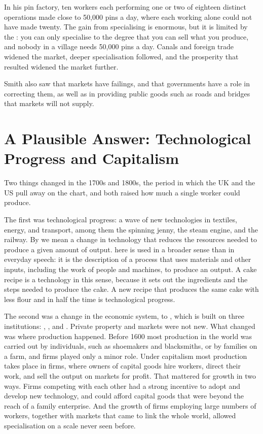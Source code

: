 \documentclass[11pt]{article}
\begin{document}
 In his pin factory, ten workers each performing one or two of eighteen distinct operations made close to 50,000 pins a day, where each working alone could not have made twenty. The gain from specialising is enormous, but it is limited by the : you can only specialise to the degree that you can sell what you produce, and nobody in a village needs 50,000 pins a day. Canals and foreign trade widened the market, deeper specialisation followed, and the prosperity that resulted widened the market further.

Smith also saw that markets have failings, and that governments have a role in correcting them, as well as in providing public goods such as roads and bridges that markets will not supply.

\section{A Plausible Answer: Technological Progress and Capitalism}

Two things changed in the 1700s and 1800s, the period in which the UK and the US pull away on the chart, and both raised how much a single worker could produce.

The first was technological progress: a wave of new technologies in textiles, energy, and transport, among them the spinning jenny, the steam engine, and the railway. By  we mean a change in technology that reduces the resources needed to produce a given amount of output.  here is used in a broader sense than in everyday speech: it is the description of a process that uses materials and other inputs, including the work of people and machines, to produce an output. A cake recipe is a technology in this sense, because it sets out the ingredients and the steps needed to produce the cake. A new recipe that produces the same cake with less flour and in half the time is technological progress.

The second was a change in the economic system, to , which is built on three institutions: , , and . Private property and markets were not new. What changed was where production happened. Before 1600 most production in the world was carried out by individuals, such as shoemakers and blacksmiths, or by families on a farm, and firms played only a minor role. Under capitalism most production takes place in firms, where owners of capital goods hire workers, direct their work, and sell the output on markets for profit. That mattered for growth in two ways. Firms competing with each other had a strong incentive to adopt and develop new technology, and could afford capital goods that were beyond the reach of a family enterprise. And the growth of firms employing large numbers of workers, together with markets that came to link the whole world, allowed specialisation on a scale never seen before.
\end{document}
